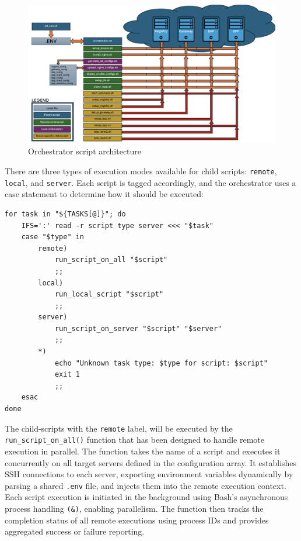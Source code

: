 \begin{figure}[h!]
    \centering
    \includegraphics[width=1\textwidth]{Images/orchestrator_architecture.png}
    \caption{Orchestrator script architecture}
    \label{fig:Orchestrator_architecture}
\end{figure}

There are three types of execution modes available for child scripts: \texttt{remote}, \texttt{local}, and \texttt{server}. Each script is tagged accordingly, and the orchestrator uses a case statement to determine how it should be executed:

\begin{verbatim}
for task in "${TASKS[@]}"; do
    IFS=':' read -r script type server <<< "$task"
    case "$type" in
        remote)
            run_script_on_all "$script"
            ;;
        local)
            run_local_script "$script"
            ;;
        server)
            run_script_on_server "$script" "$server"
            ;;
        *)
            echo "Unknown task type: $type for script: $script"
            exit 1
            ;;
    esac
done
\end{verbatim}

The child-scripts with the \texttt{remote} label, will be executed by the \texttt{run\_script\_on\_all()} function that has been designed to handle remote execution in parallel. The function takes the name of a script and executes it concurrently on all target servers defined in the configuration array. It establishes SSH connections to each server, exporting environment variables dynamically by parsing a shared \texttt{.env} file, and injects them into the remote execution context. Each script execution is initiated in the background using Bash’s asynchronous process handling \texttt{(\&)}, enabling parallelism. The function then tracks the completion status of all remote executions using process IDs and provides aggregated success or failure reporting.

